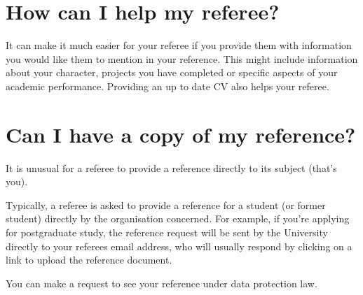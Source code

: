 \documentclass[
  12pt,
]{book}
\begin{document}
\hypertarget{how-can-i-help-my-referee}{%
\section{How can I help my referee?}\label{how-can-i-help-my-referee}}

It can make it much easier for your referee if you provide them with information you would like them to mention in your reference. This might include information about your character, projects you have completed or specific aspects of your academic performance. Providing an up to date CV also helps your referee.

\hypertarget{can-i-have-a-copy-of-my-reference}{%
\section{Can I have a copy of my reference?}\label{can-i-have-a-copy-of-my-reference}}

It is unusual for a referee to provide a reference directly to its subject (that's you).

Typically, a referee is asked to provide a reference for a student (or former student) directly by the organisation concerned. For example, if you're applying for postgraduate study, the reference request will be sent by the University directly to your referees email address, who will usually respond by clicking on a link to upload the reference document.

You can make a request to see your reference under data protection law.

  
\end{document}
